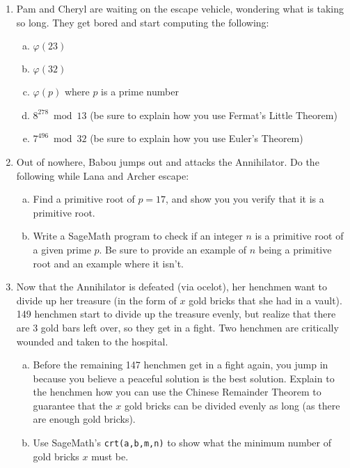 \documentclass[12pt]{amsart}
\theoremstyle{plain}
\theoremstyle{definition}
\begin{document}
\begin{enumerate}[1.]
	\item Pam and Cheryl are waiting on the escape vehicle, wondering what is taking so long.  They get bored and start computing the following:
		\begin{enumerate}[a.]
			\item $\varphi(23)$\\
			\item $\varphi(32)$\\
			\item $\varphi(p)$ where $p$ is a prime number\\
			\item $8^{278} \bmod 13$ (be sure to explain how you use Fermat's Little Theorem)\\
			\item $7^{496} \bmod 32$ (be sure to explain how you use Euler's Theorem)\\
		\end{enumerate}
	\item Out of nowhere, Babou jumps out and attacks the Annihilator.  Do the following while Lana and Archer escape:\\
		\begin{enumerate}[a.]
			\item Find a primitive root of $p = 17$, and show you you verify that it is a primitive root.\\
			\item Write a SageMath program to check if an integer $n$ is a primitive root of a given prime $p$.  Be sure to provide an example of $n$ being a primitive root and an example where it isn't.\\
		\end{enumerate}
	\item Now that the Annihilator is defeated (via ocelot), her henchmen want to divide up her treasure (in the form of $x$ gold bricks that she had in a vault).  149 henchmen start to divide up the treasure evenly, but realize that there are 3 gold bars left over, so they get in a fight.  Two henchmen are critically wounded and taken to the hospital.\\
	\begin{enumerate}[a.]
	\item Before the remaining 147 henchmen get in a fight again, you jump in because you believe a peaceful solution is the best solution.  Explain to the henchmen how you can use the Chinese Remainder Theorem to guarantee that the $x$ gold bricks can be divided evenly as long (as there are enough gold bricks).\\
	\item Use SageMath's \texttt{crt(a,b,m,n)} to show what the minimum number of gold bricks $x$ must be.\\
	\end{enumerate}
\end{enumerate}

	
\end{document}
